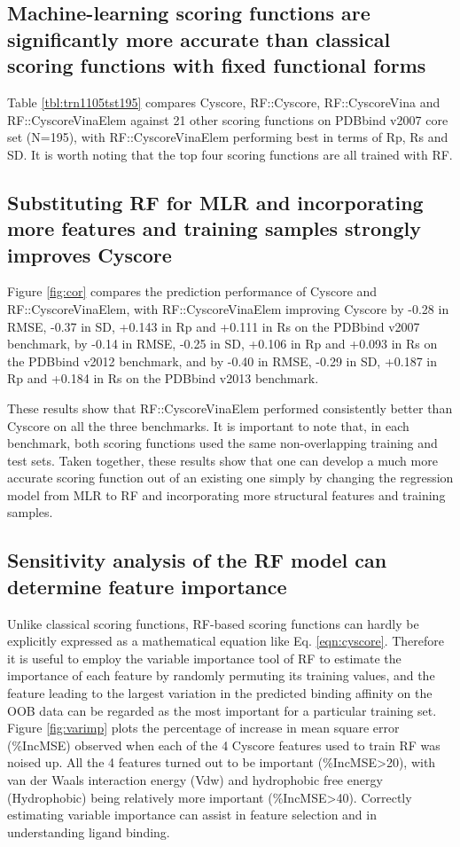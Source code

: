 \documentclass[linenumbers]{bmcart}
\begin{document}
\subsection*{Machine-learning scoring functions are significantly more accurate than classical scoring functions with fixed functional forms}

Table \ref{tbl:trn1105tst195} compares Cyscore, RF::Cyscore, RF::CyscoreVina and RF::CyscoreVinaElem against 21 other scoring functions on PDBbind v2007 core set (N=195), with RF::CyscoreVinaElem performing best in terms of Rp, Rs and SD. It is worth noting that the top four scoring functions are all trained with RF.

\subsection*{Substituting RF for MLR and incorporating more features and training samples strongly improves Cyscore}

Figure \ref{fig:cor} compares the prediction performance of Cyscore and RF::CyscoreVinaElem, with RF::CyscoreVinaElem improving Cyscore by -0.28 in RMSE, -0.37 in SD, +0.143 in Rp and +0.111 in Rs on the PDBbind v2007 benchmark, by -0.14 in RMSE, -0.25 in SD, +0.106 in Rp and +0.093 in Rs on the PDBbind v2012 benchmark, and by -0.40 in RMSE, -0.29 in SD, +0.187 in Rp and +0.184 in Rs on the PDBbind v2013 benchmark.

These results show that RF::CyscoreVinaElem performed consistently better than Cyscore on all the three benchmarks. It is important to note that, in each benchmark, both scoring functions used the same non-overlapping training and test sets. Taken together, these results show that one can develop a much more accurate scoring function out of an existing one simply by changing the regression model from MLR to RF and incorporating more structural features and training samples.

\subsection*{Sensitivity analysis of the RF model can determine feature importance}

Unlike classical scoring functions, RF-based scoring functions can hardly be explicitly expressed as a mathematical equation like Eq. \ref{eqn:cyscore}. Therefore it is useful to employ the variable importance tool of RF to estimate the importance of each feature by randomly permuting its training values, and the feature leading to the largest variation in the predicted binding affinity on the OOB data can be regarded as the most important for a particular training set. Figure \ref{fig:varimp} plots the percentage of increase in mean square error (\%IncMSE) observed when each of the 4 Cyscore features used to train RF was noised up. All the 4 features turned out to be important (\%IncMSE\textgreater 20), with van der Waals interaction energy (Vdw) and hydrophobic free energy (Hydrophobic) being relatively more important (\%IncMSE\textgreater 40). Correctly estimating variable importance can assist in feature selection and in understanding ligand binding.
\end{document}
